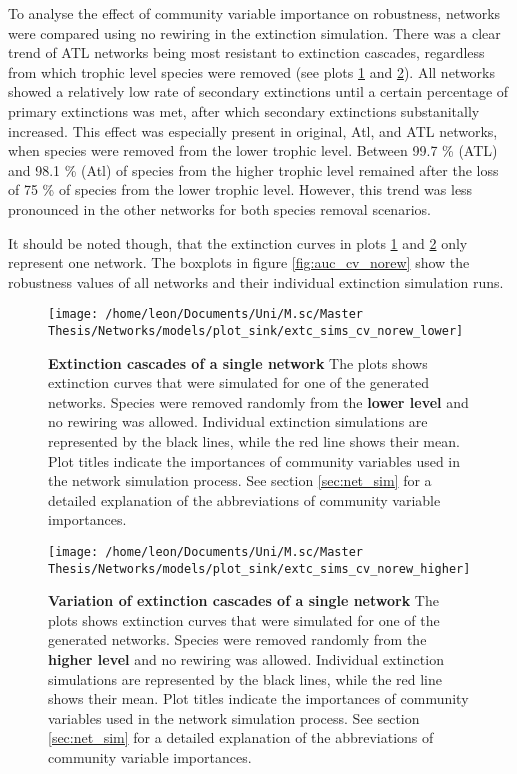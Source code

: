 \documentclass[12pt,a4paper]{article}
\begin{document}
To analyse the effect of community variable importance on robustness, networks were compared using no rewiring in the extinction simulation. There was a clear trend of ATL networks being most resistant to extinction cascades, regardless from which trophic level species were removed (see plots \ref{fig:extc_cv_norew_lower} and \ref{fig:extc_cv_norew_higher}). All networks showed a relatively low rate of secondary extinctions until a certain percentage of primary extinctions was met, after which secondary extinctions substanitally increased. This effect was especially present in original, Atl, and ATL networks, when species were removed from the lower trophic level.  Between 99.7 \% (ATL) and 98.1 \% (Atl) of species from the higher trophic level remained after the loss of 75 \% of species from the lower trophic level. However, this trend was less pronounced in the other networks for both species removal scenarios. \par


It should be noted though, that the extinction curves in plots \ref{fig:extc_cv_norew_lower} and \ref{fig:extc_cv_norew_higher} only represent one network. The boxplots in figure \ref{fig:auc_cv_norew} show the robustness values of all networks and their individual extinction simulation runs.
\begin{figure}[H]
	 \texttt{[image: /home/leon/Documents/Uni/M.sc/Master Thesis/Networks/models/plot\_sink/extc\_sims\_cv\_norew\_lower]}
	 \caption{\textbf{Extinction cascades of a single network} The plots shows extinction curves that were simulated for one of the generated networks. Species were removed randomly from the \textbf{lower level} and no rewiring was allowed. Individual extinction simulations are represented by the black lines, while the red line shows their mean. Plot titles indicate the importances of community variables used in the network simulation process. See section \ref{sec:net_sim} for a detailed explanation of the abbreviations of community variable importances.}
	 \label{fig:extc_cv_norew_lower}
\end{figure}


\begin{figure}[H]
	 \texttt{[image: /home/leon/Documents/Uni/M.sc/Master Thesis/Networks/models/plot\_sink/extc\_sims\_cv\_norew\_higher]}
	 \caption{\textbf{Variation of extinction cascades of a single network} The plots shows extinction curves that were simulated for one of the generated networks. Species were removed randomly from the \textbf{higher level} and no rewiring was allowed. Individual extinction simulations are represented by the black lines, while the red line shows their mean. Plot titles indicate the importances of community variables used in the network simulation process. See section \ref{sec:net_sim} for a detailed explanation of the abbreviations of community variable importances.}
	 \label{fig:extc_cv_norew_higher}
\end{figure}
\end{document}
